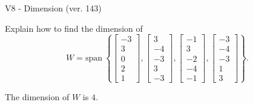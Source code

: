 \begin{exercise}
  \begin{exerciseTitle}V8 - Dimension (ver. 143)\end{exerciseTitle}
  \begin{exerciseStatement}
    Explain how to find the dimension of 
\[W=\mathrm{span}\ \left\{\left[\begin{array}{r}
-3 \\
3 \\
0 \\
2 \\
1
\end{array}\right] , \left[\begin{array}{r}
3 \\
-4 \\
-3 \\
3 \\
-3
\end{array}\right] , \left[\begin{array}{r}
-1 \\
3 \\
-2 \\
-4 \\
-1
\end{array}\right] , \left[\begin{array}{r}
-3 \\
-4 \\
-3 \\
1 \\
3
\end{array}\right]\right\}.\]



  \end{exerciseStatement}
  \begin{exerciseAnswer}
   The dimension of \(W\) is  \(4\).
  


  \end{exerciseAnswer}
\end{exercise}